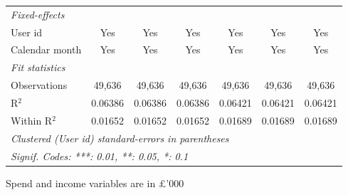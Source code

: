 \begin{table}[htbp]
\begin{threeparttable}[b]
\begin{tabular}{lcccccc}
         \midrule
         \emph{Fixed-effects}\\
         User id                   & Yes            & Yes            & Yes            & Yes            & Yes             & Yes\\  
         Calendar month            & Yes            & Yes            & Yes            & Yes            & Yes             & Yes\\  
         \midrule
         \emph{Fit statistics}\\
         Observations              & 49,636         & 49,636         & 49,636         & 49,636         & 49,636          & 49,636\\  
         R$^2$                     & 0.06386        & 0.06386        & 0.06386        & 0.06421        & 0.06421         & 0.06421\\  
         Within R$^2$              & 0.01652        & 0.01652        & 0.01652        & 0.01689        & 0.01689         & 0.01689\\  
         \midrule \midrule
         \multicolumn{7}{l}{\emph{Clustered (User id) standard-errors in parentheses}}\\
         \multicolumn{7}{l}{\emph{Signif. Codes: ***: 0.01, **: 0.05, *: 0.1}}\\
      \end{tabular}
      
      \begin{tablenotes}\footnotesize
         \item Spend and income variables are in £'000
      \end{tablenotes}
   \end{threeparttable}
\end{table}


